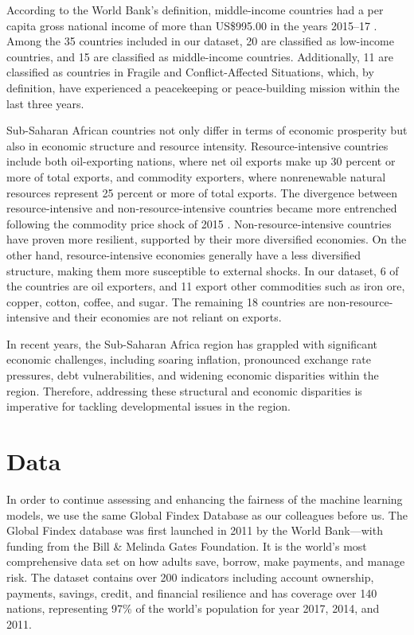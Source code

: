 \documentclass[12pt]{article}
\begin{document}
According to the World Bank's definition, middle-income countries had a
per capita gross national income of more than US\$995.00 in the years
2015--17 \citep{IMF_2019}. Among the 35 countries included in our
dataset, 20 are classified as low-income countries, and 15 are
classified as middle-income countries. Additionally, 11 are classified
as countries in Fragile and Conflict-Affected Situations, which, by
definition, have experienced a peacekeeping or peace-building mission
within the last three years.

Sub-Saharan African countries not only differ in terms of economic
prosperity but also in economic structure and resource intensity.
Resource-intensive countries include both oil-exporting nations, where
net oil exports make up 30 percent or more of total exports, and
commodity exporters, where nonrenewable natural resources represent 25
percent or more of total exports. The divergence between
resource-intensive and non-resource-intensive countries became more
entrenched following the commodity price shock of 2015
\citep{Newiak_2016}. Non-resource-intensive countries have proven more
resilient, supported by their more diversified economies. On the other
hand, resource-intensive economies generally have a less diversified
structure, making them more susceptible to external shocks. In our
dataset, 6 of the countries are oil exporters, and 11 export other
commodities such as iron ore, copper, cotton, coffee, and sugar. The
remaining 18 countries are non-resource-intensive and their economies
are not reliant on exports.

In recent years, the Sub-Saharan Africa region has grappled with
significant economic challenges, including soaring inflation, pronounced
exchange rate pressures, debt vulnerabilities, and widening economic
disparities within the region. Therefore, addressing these structural
and economic disparities is imperative for tackling developmental issues
in the region.

\hypertarget{data}{%
\section{Data}\label{data}}

In order to continue assessing and enhancing the fairness of the machine
learning models, we use the same Global Findex Database as our
colleagues before us\citep{Porta2022}. The Global Findex database was
first launched in 2011 by the World Bank---with funding from the Bill \&
Melinda Gates Foundation. It is the world's most comprehensive data set
on how adults save, borrow, make payments, and manage risk. The dataset
contains over 200 indicators including account ownership, payments,
savings, credit, and financial resilience and has coverage over 140
nations, representing 97\% of the world's population for year 2017,
2014, and 2011\citep{Demirguc-Kunt2022}.
\end{document}
